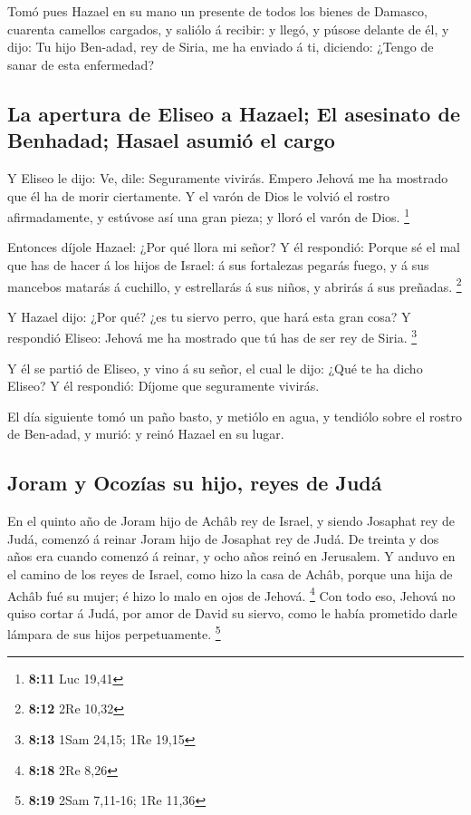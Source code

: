  Tomó pues Hazael en su mano un presente de todos los bienes
de Damasco, cuarenta camellos cargados, y saliólo á recibir: y llegó, y
púsose delante de él, y dijo: Tu hijo Ben-adad, rey de Siria, me ha
enviado á ti, diciendo: ¿Tengo de sanar de esta enfermedad?

\hypertarget{la-apertura-de-eliseo-a-hazael-el-asesinato-de-benhadad-hasael-asumiuxf3-el-cargo}{%
\subsection{La apertura de Eliseo a Hazael; El asesinato de Benhadad;
Hasael asumió el
cargo}\label{la-apertura-de-eliseo-a-hazael-el-asesinato-de-benhadad-hasael-asumiuxf3-el-cargo}}

 Y Eliseo le dijo: Ve, dile: Seguramente vivirás. Empero
Jehová me ha mostrado que él ha de morir ciertamente.  Y el
varón de Dios le volvió el rostro afirmadamente, y estúvose así una gran
pieza; y lloró el varón de Dios. \footnote{\textbf{8:11} Luc 19,41}

 Entonces díjole Hazael: ¿Por qué llora mi señor? Y él
respondió: Porque sé el mal que has de hacer á los hijos de Israel: á
sus fortalezas pegarás fuego, y á sus mancebos matarás á cuchillo, y
estrellarás á sus niños, y abrirás á sus preñadas. \footnote{\textbf{8:12}
  2Re 10,32}

 Y Hazael dijo: ¿Por qué? ¿es tu siervo perro, que hará
esta gran cosa? Y respondió Eliseo: Jehová me ha mostrado que tú has de
ser rey de Siria. \footnote{\textbf{8:13} 1Sam 24,15; 1Re 19,15}

 Y él se partió de Eliseo, y vino á su señor, el cual le
dijo: ¿Qué te ha dicho Eliseo? Y él respondió: Díjome que seguramente
vivirás.

 El día siguiente tomó un paño basto, y metiólo en agua, y
tendiólo sobre el rostro de Ben-adad, y murió: y reinó Hazael en su
lugar.

\hypertarget{joram-y-ocozuxedas-su-hijo-reyes-de-juduxe1}{%
\subsection{Joram y Ocozías su hijo, reyes de
Judá}\label{joram-y-ocozuxedas-su-hijo-reyes-de-juduxe1}}

 En el quinto año de Joram hijo de Achâb rey de Israel, y
siendo Josaphat rey de Judá, comenzó á reinar Joram hijo de Josaphat rey
de Judá.  De treinta y dos años era cuando comenzó á
reinar, y ocho años reinó en Jerusalem.  Y anduvo en el
camino de los reyes de Israel, como hizo la casa de Achâb, porque una
hija de Achâb fué su mujer; é hizo lo malo en ojos de Jehová.
\footnote{\textbf{8:18} 2Re 8,26}  Con todo eso, Jehová no
quiso cortar á Judá, por amor de David su siervo, como le había
prometido darle lámpara de sus hijos perpetuamente. \footnote{\textbf{8:19}
  2Sam 7,11-16; 1Re 11,36}

